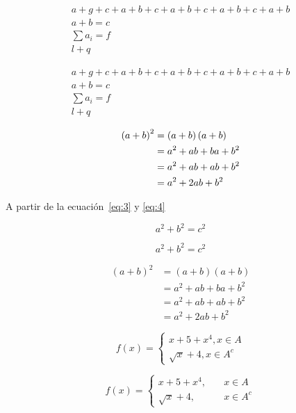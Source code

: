 \documentclass[a4paper]{report}
\numberwithin{equation}{section}
\theoremstyle{definition}
\theoremstyle{plain}
\theoremstyle{remark}
\begin{document}
\begin{gather}
a+g+c+a+b+c+a+b+c+a+b+c+a+b\\
a+b=c\\
\sum a_i = f\\
l+q
\end{gather}

\begin{gather*}
a+g+c+a+b+c+a+b+c+a+b+c+a+b\\
a+b=c\\
\sum a_i = f\\
l+q
\end{gather*}

\begin{align}\label{eq:3}
{\left(a+b\right)}^{2}&=\left(a+b\right)\left(a+b\right)\\
											&=a^{2}+ab+ba+b^{2}\notag\\
											&=a^{2}+ab+ab+b^{2}\notag\\
											&=a^{2}+2ab+b^{2}\label{eq:4}
\end{align}

A partir de la ecuación~\ref{eq:3} y \eqref{eq:4}

\begin{equation}
a^{2}+b^{2}=c^{2}\tag{T. Pitágoras}
\end{equation}

\begin{equation}
a^{2}+b^{2}=c^{2}\tag*{T. Pitágoras}
\end{equation}

\begin{align*}
{\left(a+b\right)}^{2}&=\left(a+b\right)\left(a+b\right)\\
&=a^{2}+ab+ba+b^{2}\\
&=a^{2}+ab+ab+b^{2}\\
&=a^{2}+2ab+b^{2}
\end{align*}


\newpage

\begin{equation}
f(x)=\left\{\begin{gathered}
x+5+x^{4}, x\in A \\
\sqrt{x}+4, x\in A^{c}
\end{gathered}\right.
\end{equation}

\begin{equation}
f(x)=\left\{\begin{aligned}
x+5+x^{4}, &\quad x\in A \\
\sqrt{x}+4, &\quad x\in A^{c}
\end{aligned}\right.
\end{equation}
\end{document}
